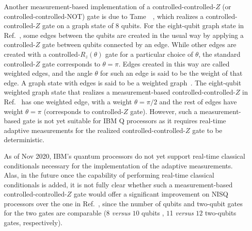 \bigskip
\noindent
Another measurement-based implementation of a controlled-controlled-$Z$ (or controlled-controlled-NOT) gate is due to Tame~\etal~\cite{Tame_2009}, which realizes a controlled-controlled-$Z$ gate on a graph state of $8$ qubits. For the eight-qubit graph state in Ref.~\cite{Tame_2009}, some edges between the qubits are created in the usual way by applying a controlled-$Z$ gate between qubits connected by an edge. While other edges are created with a controlled-$R_z(\theta)$ gate for a particular choice of $\theta$,  the standard controlled-$Z$ gate corresponds to $\theta=\pi$. Edges created in this way are called weighted edges, and the angle $\theta$ for such an edge is said to be the weight of that edge. A graph state with edges is said to be a weighted graph~\cite{Tame_2009}. The eight-qubit weighted graph state that realizes a measurement-based controlled-controlled-$Z$ in Ref.~\cite{Tame_2009} has one weighted edge, with a weight $\theta=\pi/2$ and the rest of edges have weight $\theta=\pi$ (corresponds to controlled-$Z$ gate). However, such a measurement-based gate is not yet suitable for IBM Q processors as it requires real-time adaptive measurements for the realized controlled-controlled-$Z$ gate to be deterministic. 

\clearpage
\noindent
As of Nov 2020, IBM's quantum processors do not yet support real-time classical conditionals necessary for the implementation of the adaptive measurements. Alas, in the future once the capability of performing real-time classical conditionals is added, it is not fully clear whether such a measurement-based controlled-controlled-$Z$ gate would offer a significant improvement on \acs{NISQ} processors over the one in Ref.~\cite{Browne_2016}, since the number of qubits and two-qubit gates for the two gates are comparable ($8$ \emph{versus} $10$ qubits , $1$1 \emph{versus} $12$ two-qubits gates, respectively).
